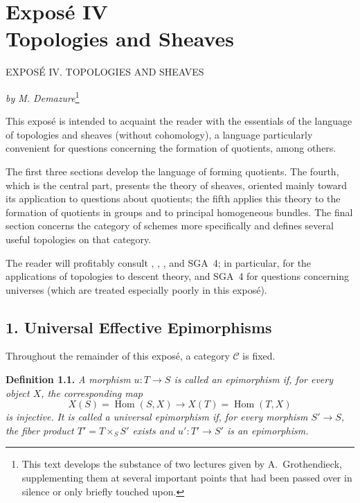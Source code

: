 
\chapter*{Expos\'e IV\\Topologies and Sheaves}
%
  {EXPOS\'E IV. TOPOLOGIES AND SHEAVES}

\begingroup
\renewcommand{\thefootnote}{\fnsymbol{footnote}}
\begin{center}
  \textit{by M. Demazure}\footnote{This text develops the substance of two
  lectures given by A.~Grothendieck, supplementing them at several important
  points that had been passed over in silence or only briefly touched upon.}
\end{center}
\endgroup


This expos\'e is intended to acquaint the reader with the essentials of the
language of topologies and sheaves (without cohomology), a language
particularly convenient for questions concerning the formation of quotients,
among others.

The first three sections develop the language of forming quotients. The
fourth, which is the central part, presents the theory of sheaves, oriented
mainly toward its application to questions about quotients; the fifth applies
this theory to the formation of quotients in groups and to principal
homogeneous bundles. The final section concerns the category of schemes more
specifically and defines several useful topologies on that category.

The reader will profitably consult , , , and SGA~4; in particular,
 for the applications of topologies to descent theory, and SGA~4 for
questions concerning universes (which are treated especially poorly in this
expos\'e).

\section*{1. Universal Effective Epimorphisms}

Throughout the remainder of this expos\'e, a category \(\mathscr C\) is fixed.

\medskip
\noindent{}\textbf{Definition 1.1.}
\textit{A morphism \(u:T\to S\) is called an \emph{epimorphism} if, for every
object \(X\), the corresponding map}
\[
  X(S)=\operatorname{Hom}(S,X)
  \longrightarrow
  X(T)=\operatorname{Hom}(T,X)
\]
\textit{is injective.}
\textit{It is called a \emph{universal epimorphism} if, for every morphism
\(S'\to S\), the fiber product \(T'=T\times_S S'\) exists and
\(u':T'\to S'\) is an epimorphism.}

